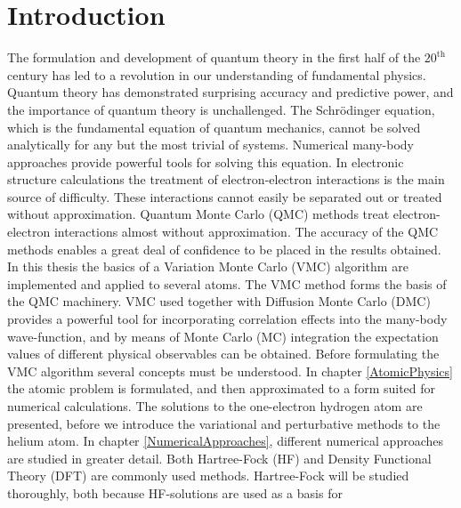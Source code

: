 \chapter{Introduction}
\label{introduction}

The formulation and development of quantum theory in the first half of
the $20^{\mathrm{th}}$ century has led to a revolution in our
understanding of fundamental physics. Quantum theory has demonstrated
surprising accuracy and predictive power, and the importance of
quantum theory is unchallenged. The Schr\"odinger equation, which is
the fundamental equation of quantum mechanics, cannot be solved
analytically for any but the most trivial of systems. Numerical
many-body approaches provide powerful tools for solving this
equation.
\newline
%
\newline
In electronic structure calculations the treatment of
electron-electron interactions is the main source of
difficulty. These interactions cannot easily be separated out or
treated without approximation. Quantum Monte Carlo (QMC) methods treat
electron-electron interactions almost without approximation. The
accuracy of the QMC methods enables a great deal of confidence to be
placed in the results obtained.
\newline
%
\newline
In this thesis the basics of a Variation Monte Carlo (VMC) algorithm
are implemented and applied to several atoms. The VMC method forms the
basis of the QMC machinery. VMC used together with Diffusion Monte
Carlo (DMC) provides a powerful tool for incorporating correlation
effects into the many-body wave-function, and by means of Monte Carlo
(MC) integration the expectation values of different physical
observables can be obtained.
\newline
%
\newline
Before formulating the VMC algorithm several concepts
must be understood. In chapter \ref{AtomicPhysics} the atomic problem
is formulated, and then approximated to a form suited for numerical
calculations. The solutions to the one-electron hydrogen atom are
presented, before we introduce the variational and perturbative
methods to the helium atom.
\newline
%
\newline
In chapter \ref{NumericalApproaches}, different numerical approaches
are studied in greater detail. Both Hartree-Fock (HF) and Density
Functional Theory (DFT) are commonly used methods. Hartree-Fock will be
studied thoroughly, both because HF-solutions are used as a basis for
